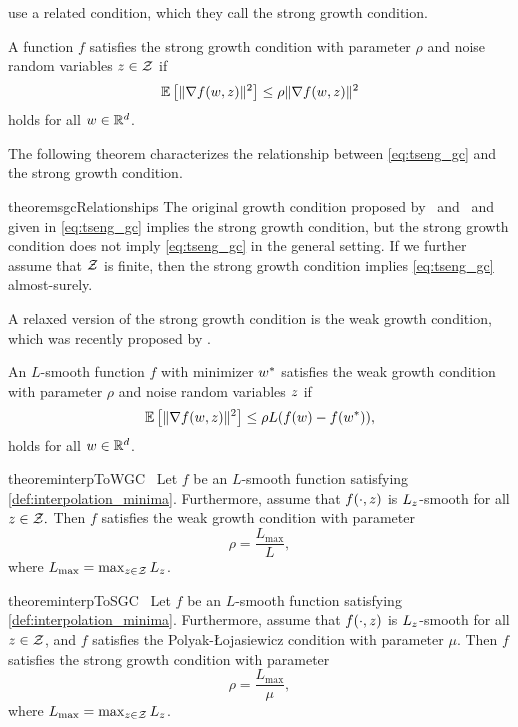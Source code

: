 \citet{vaswani2019fast} use a related condition, which they call the strong growth condition.
\begin{definition}\label{def:strong_growth}
    A function \(f\) satisfies the strong growth condition with parameter \(\rho \) and noise random variables \(z \in \mathcal{Z} \) if
    \[ \mathbb{E}\left[\|\nabla f(w, z)\|^2\right] \leq \rho \|\nabla f(w, z)\|^2 \]
    holds for all \(w \in \mathbb{R}^d\).
\end{definition}

The following theorem characterizes the relationship between \autoref{eq:tseng_gc} and the strong growth condition.

\begin{restatable}{theorem}{sgcRelationships}\label{thm:sgc_relationships}
    The original growth condition proposed by~\citet{solodov1998incremental} and~\citet{tseng1998incremental} and given in \autoref{eq:tseng_gc} implies the strong growth condition, but
    the strong growth condition does not imply \autoref{eq:tseng_gc} in the general setting.
    If we further assume that \( \mathcal{Z} \) is finite, then the strong growth condition implies \autoref{eq:tseng_gc} almost-surely.
\end{restatable} 


A relaxed version of the strong growth condition is the weak growth condition, which was recently proposed by \citet{vaswani2019fast}.

\begin{definition}\label{def:weak_growth}
    An \(L\)-smooth function \(f\) with minimizer \(w^* \) satisfies the weak growth condition with parameter \(\rho \) and noise random variables \( z \) if
    \[ \mathbb{E}\left[\|\nabla f(w, z)\|^2\right] \leq \rho L (f(w) - f(w^*)), \]
    holds for all \(w \in \mathbb{R}^d\).
\end{definition}


\begin{restatable}{theorem}{interpToWGC}~\label{thm:interp_to_wgc}
    Let \( f \) be an \( L \)-smooth function satisfying \autoref{def:interpolation_minima}.
    Furthermore, assume that \( f(\cdot, z) \) is \( L_z \)-smooth for all \( z \in \mathcal{Z}. \)
    Then \( f \) satisfies the weak growth condition with parameter
    \[ \rho = \frac{L_{\text{max}}}{L}, \]
    where \( L_{\text{max}} = \max_{z \in \mathcal{Z}} L_z \).
\end{restatable}


\begin{restatable}{theorem}{interpToSGC}~\label{thm:interp_to_sgc}
    Let \( f \) be an \( L \)-smooth function satisfying \autoref{def:interpolation_minima}.
    Furthermore, assume that \( f(\cdot, z) \) is \( L_z \)-smooth for all \( z \in \mathcal{Z} \),
    and \( f \) satisfies the Polyak-Łojasiewicz condition with parameter \( \mu \).
    Then \( f \) satisfies the strong growth condition with parameter
    \[ \rho = \frac{L_{\text{max}}}{\mu}, \]
    where \( L_{\text{max}} = \max_{z \in \mathcal{Z}} L_z \).
\end{restatable}

